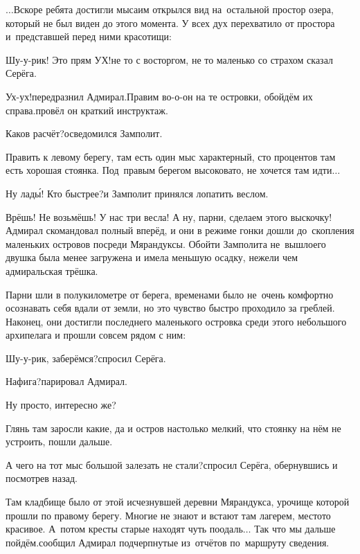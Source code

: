 \vspace{0.5cm}
$\ldots$Вскоре ребята достигли мыса\mdash им открылся вид на~остальной простор озера, который не был виден до этого момента. У всех дух перехватило от простора и~представшей перед ними красотищи:

\diagdash Шу-у-рик! Это прям УХ!\mdash не то с восторгом, не то маленько со страхом сказал Серёга.

\diagdash Ух-ух!\mdash передразнил Адмирал.\mdash Правим во-о-он на те островки, обойдём их справа.\mdash провёл он краткий инструктаж.

\diagdash Каков расчёт?\mdash осведомился Замполит.

\diagdash Править к левому берегу, там есть один мыс характерный, сто процентов там есть хорошая стоянка. Под~правым берегом высоковато, не хочется там идти$\ldots$

\diagdash Ну лад\'{ы}! Кто быстрее?\mdash и Замполит принялся лопатить веслом.

\diagdash Врёшь! Не возьмёшь! У нас три весла! А ну, парни, сделаем этого выскочку!\mdash Адмирал скомандовал полный вперёд, и они в режиме гонки дошли до~скопления маленьких островов посреди Мярандуксы. Обойти Замполита не~вышло\mdash его двушка была менее загружена и имела меньшую осадку, нежели чем адмиральская трёшка. 

Парни шли в полукилометре от берега, временами было не~очень комфортно осознавать себя вдали от земли, но это чувство быстро проходило за греблей. Наконец, они достигли последнего маленького островка среди этого небольшого архипелага и прошли совсем рядом с ним:

\diagdash Шу-у-рик, заберёмся?\mdash спросил Серёга.

\diagdash Нафига?\mdash парировал Адмирал.

\diagdash Ну просто, интересно же?

\diagdash Глянь там заросли какие, да и остров настолько мелкий, что стоянку на нём не устроить, пошли дальше.

\diagdash А чего на тот мыс большой залезать не стали?\mdash спросил Серёга, обернувшись и посмотрев назад.

\diagdash Там кладбище было от этой исчезнувшей деревни Мярандукса, урочище которой прошли по правому берегу. Многие не знают и встают там лагерем, место\sdash то красивое. А~потом кресты старые находят чуть поодаль$\ldots$ Так что мы дальше пойдём.\mdash сообщил Адмирал подчерпнутые из~отчётов по~маршруту сведения.

